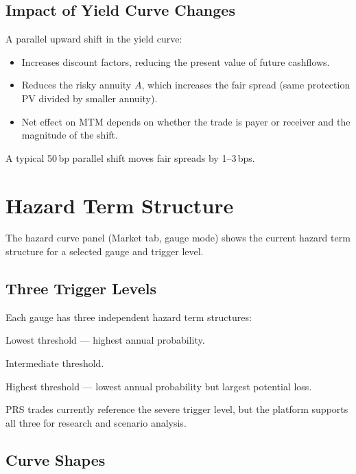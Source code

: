 \documentclass[11pt,a4paper]{article}
\begin{document}
\subsection{Impact of Yield Curve Changes}

A parallel upward shift in the yield curve:
\begin{itemize}
  \item Increases discount factors, reducing the present value of
        future cashflows.
  \item Reduces the risky annuity $A$, which increases the fair
        spread (same protection PV divided by smaller annuity).
  \item Net effect on MTM depends on whether the trade is payer or
        receiver and the magnitude of the shift.
\end{itemize}

\noindent A typical 50\,bp parallel shift moves fair spreads by
1--3\,bps.


\section{Hazard Term Structure}

The hazard curve panel (Market tab, gauge mode) shows the current
hazard term structure for a selected gauge and trigger level.

\subsection{Three Trigger Levels}

Each gauge has three independent hazard term structures:
\begin{description}[leftmargin=2em]
  \item[Alert] Lowest threshold --- highest annual probability.
  \item[Warning] Intermediate threshold.
  \item[Severe] Highest threshold --- lowest annual probability but
        largest potential loss.
\end{description}

\noindent PRS trades currently reference the severe trigger level, but
the platform supports all three for research and scenario analysis.

\subsection{Curve Shapes}
\end{document}
